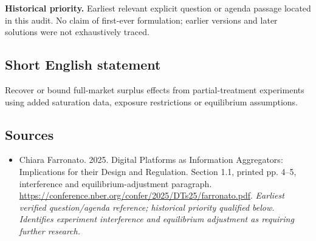 \documentclass[11pt]{article}
\begin{document}
\par\textbf{Historical priority.} Earliest relevant explicit question or agenda passage located in this audit. No claim of first-ever formulation; earlier versions and later solutions were not exhaustively traced.

\subsection{Short English statement}
Recover or bound full-market surplus effects from partial-treatment experiments using added saturation data, exposure restrictions or equilibrium assumptions.

\subsection{Sources}
\begin{itemize}\raggedright
\item[\textnormal{[S1]}]\hypertarget{source:30007703:1}{} Chiara Farronato. 2025. Digital Platforms as Information Aggregators: Implications for their Design and Regulation. Section 1.1, printed pp. 4–5, interference and equilibrium-adjustment paragraph.
\url{https://conference.nber.org/confer/2025/DTs25/farronato.pdf}.
{\small\textit{Earliest verified question/agenda reference; historical priority qualified below. Identifies experiment interference and equilibrium adjustment as requiring further research.}}
\end{itemize}
\end{document}
